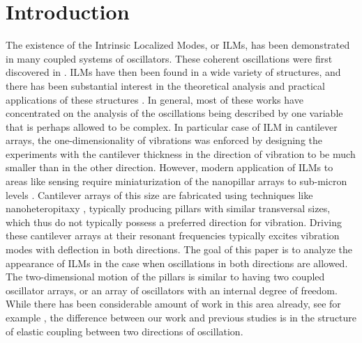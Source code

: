 \documentclass[12pt]{report}
\begin{document}
\section{Introduction} 
The existence of the Intrinsic Localized Modes, or ILMs, has been demonstrated in many coupled systems of oscillators. 
These coherent oscillations were first discovered in \cite{SiTa1988,Page1990}. ILMs have then been found in a wide variety of structures, and there has been substantial  interest in the theoretical analysis and practical applications of these structures \cite{KeBiRa2001,KeKo2002,Sato-etal-2003,Sato-PRL-2003,SaSi2004,Ke-etal-2004,SaHuSi2006,Hi-etal-2007,SaSi2008,KiHi2009,KiHi2009-2,SaSi2009}. In general, most of these works have concentrated on the analysis of the oscillations being described by one variable that is perhaps allowed to be complex.  In particular case of ILM in cantilever arrays, the one-dimensionality of vibrations was enforced by designing the experiments with the cantilever thickness in the direction of vibration to be much smaller than in the other direction. However, modern application of  ILMs to areas like sensing require miniaturization of the nanopillar arrays to sub-micron levels \cite{SaSi2008-2}. Cantilever arrays of this size are fabricated using techniques like nanoheteropitaxy  \cite{He-etal-2005}, typically producing pillars with similar transversal sizes, which thus do not typically possess a preferred direction for vibration. Driving these cantilever arrays at their resonant frequencies typically excites vibration modes with deflection in both directions. The goal of this paper is to analyze the appearance of ILMs in the case when oscillations in both directions are allowed. 
%
The two-dimensional motion of the pillars is similar to having two coupled oscillator arrays, or an array of oscillators with an internal degree of freedom. While there has been considerable amount of work in this area already, see for example \cite{Ma-etal-2002,ThEnSi2008,En-etal-2010}, the difference between our work and previous studies is in the structure of elastic coupling between two directions of oscillation. 
\end{document}
